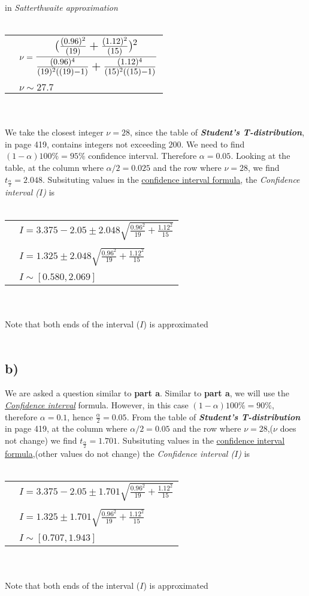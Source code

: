 \documentclass[12pt]{article}
\begin{document}
in \textit{Satterthwaite approximation}
\\ \\
\begin{tabular}{l l}
    &$\nu=\trilargeMathText{\largeexpr}$\\
    &\\
    &$\nu \sim 27.7$\\
\end{tabular}
\\ \\
We take the closest integer $\nu = 28$, since 
the table of \textit{\textbf{Student’s T-distribution}}, in page 419,
contains integers not exceeding $200$. 
We need to find $(1-\alpha)100\%=95\%$ confidence interval.
Therefore $\alpha = 0.05$. Looking at the table, at the 
column where \hypertarget{partalpha}{$\alpha/2=0.025$}
and the row where $\nu=28$, we find
$t_{\frac{\alpha}{2}}=2.048$. Subsituting values in the 
\hyperlink{confdiff}{confidence interval formula},
the \textit{Confidence interval ($I$)} is
\\ \\
\begin{tabular}{l l}
    &$I=3.375-2.05 \pm 2.048\sqrt{\frac{0.96^2}{19}+\frac{1.12^2}{15}}$\\
    &\\
    &$I=1.325 \pm 2.048\sqrt{\frac{0.96^2}{19}+\frac{1.12^2}{15}}$\\
    &\\
    &$I \sim [0.580, 2.069]$
\end{tabular}
\\ \\
Note that both ends of the interval ($I$) is approximated 
\\ \\
\subsection*{b)}
We are asked a question similar to \textbf{part a}.
Similar to \textbf{part a}, we will use the 
\hyperlink{confdiff}{\textit{Confidence interval}} formula.
However, in this case $(1-\alpha)100\%=90\%$, therefore $\alpha=0.1$, 
hence $\frac{\alpha}{2}=0.05$.
From the table of
\textit{\textbf{Student’s T-distribution}}
in page 419, at the 
column where $\alpha/2=0.05$
and the row where $\nu=28$,($\nu$ does not change)
we find $t_{\frac{\alpha}{2}}=1.701$. Subsituting values in the 
\hyperlink{confdiff}{confidence interval formula},(other values do not change)
the \textit{Confidence interval ($I$)} is
\\ \\
\begin{tabular}{l l}
    &$I=3.375-2.05 \pm 1.701\sqrt{\frac{0.96^2}{19}+\frac{1.12^2}{15}}$\\
    &\\
    &$I=1.325 \pm 1.701\sqrt{\frac{0.96^2}{19}+\frac{1.12^2}{15}}$\\
    &\\
    &$I \sim [0.707,1.943]$ 
\end{tabular}
\\ \\
Note that both ends of the interval ($I$) is approximated 
\\ \\
\end{document}
